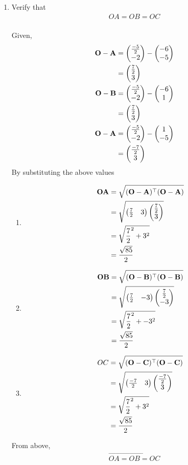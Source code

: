 \documentclass[11pt]{book}
\begin{document}
\begin{enumerate}[label=\thesection.\arabic*.,ref=\thesection.\theenumi]
\item Verify that 
		\begin{align}
			OA = OB = OC 
		\end{align}
  \solution\\
Given,
\begin{align}
    \mathbf{O - A} &= \begin{pmatrix}\frac{-5}{2} \\ -2\end{pmatrix} - \begin{pmatrix}-6 \\ -5\end{pmatrix}\\
    &= \begin{pmatrix}\frac{7}{2} \\ 3\end{pmatrix}\\
    \mathbf{O - B} &= \begin{pmatrix}\frac{-5}{2} \\ -2\end{pmatrix} - \begin{pmatrix}-6 \\ 1\end{pmatrix}\\
    &= \begin{pmatrix}\frac{7}{2} \\ 3\end{pmatrix}\\
    \mathbf{O - A} &= \begin{pmatrix}\frac{-5}{2} \\ -2\end{pmatrix} - \begin{pmatrix}1 \\ -5\end{pmatrix}\\
    &= \begin{pmatrix}\frac{-7}{2} \\ 3\end{pmatrix}
\end{align}
By substituting the above values
\begin{enumerate}
\item 
\begin{align}
\mathbf{OA} &= \sqrt{(\mathbf{O}-\mathbf{A})^{\top}(\mathbf{O}-\mathbf{A})}\\
&= \sqrt{\begin{pmatrix}\frac{7}{2} & 3\end{pmatrix} \begin{pmatrix}\frac{7}{2} \\ 3\end{pmatrix}}\\
 &= \sqrt{\frac{7}{2}^2 + 3^2}\\
 &= \frac{\sqrt{85}}{2}
\end{align}
\item 
\begin{align}
\mathbf{OB} &= \sqrt{(\mathbf{O}-\mathbf{B})^{\top}(\mathbf{O}-\mathbf{B})}\\
 &= \sqrt{\begin{pmatrix}\frac{7}{2} & -3\end{pmatrix} \begin{pmatrix}\frac{7}{2} \\ -3\end{pmatrix}}\\
 &= \sqrt{\frac{7}{2}^2 + -3^2}\\
 &= \frac{\sqrt{85}}{2}
\end{align}
\item 
\begin{align}
OC &= \sqrt{(\mathbf{O}-\mathbf{C})^{\top}(\mathbf{O}-\mathbf{C})}\\
 &= \sqrt{\begin{pmatrix}\frac{-7}{2} & 3\end{pmatrix}  \begin{pmatrix}\frac{-7}{2} \\ 3\end{pmatrix}}\\
&= \sqrt{\frac{7}{2}^2 + 3^2}\\
 &= \frac{\sqrt{85}}{2}
\end{align}
\end{enumerate}
From above, 
\begin{align}
\vec{OA = OB = OC}
\end{align}


\end{enumerate}
\end{document}
